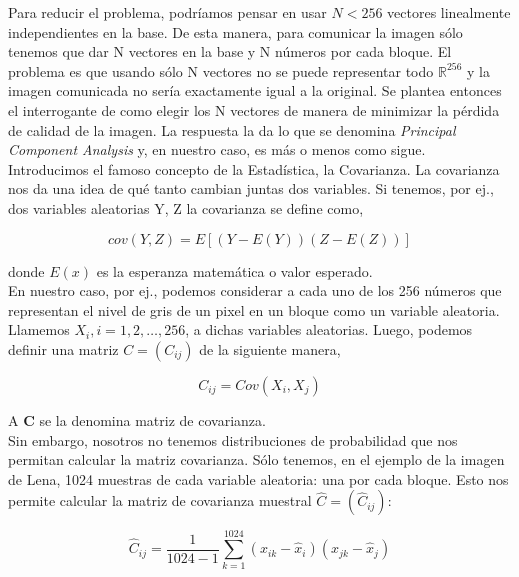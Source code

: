 \documentclass[twocolumn,a4paper,10pt]{article}
\begin{document}
Para reducir el problema, podríamos pensar en usar $N < 256$ vectores linealmente independientes en la base. De esta manera, para comunicar la imagen s\'olo
tenemos que dar N vectores en la base y N n\'umeros por cada bloque. El problema es que usando s\'olo N vectores no se puede representar todo $\mathbb{R}^{256}$ y la 
imagen comunicada no ser\'ia exactamente igual a la original. Se plantea entonces el interrogante de como elegir los N vectores de manera de minimizar la p\'erdida 
de calidad de la imagen. La respuesta la da lo que se denomina \textit{Principal Component Analysis} y, en nuestro caso, es m\'as o menos como sigue.\\

Introducimos el famoso concepto de la Estadística, la Covarianza. La covarianza nos da una idea de qu\'e tanto cambian juntas dos variables. Si tenemos, por ej., 
dos variables aleatorias Y, Z la covarianza se define como,

\begin{equation}
    cov(Y, Z) = E [(Y - E(Y )) (Z - E(Z))]
\end{equation}

donde $E(x)$ es la esperanza matem\'atica o valor esperado. \\

En nuestro caso, por ej., podemos considerar a cada uno de los 256 n\'umeros que representan el nivel de gris de un pixel en un bloque como un variable aleatoria.
Llamemos $X_{i}, i = 1, 2, \dotsc, 256$, a dichas variables aleatorias. Luego, podemos definir una matriz $C = (C_{ij} )$ de la siguiente manera,

\begin{equation}
    C_{ij} = Cov(X_{i}, X_{j})
\end{equation}

A $\textbf{C}$ se la denomina matriz de covarianza.\\

Sin embargo, nosotros no tenemos distribuciones de probabilidad que nos permitan calcular la matriz covarianza. S\'olo tenemos, en el ejemplo de la imagen
de Lena, 1024 muestras de cada variable aleatoria: una por cada bloque. Esto nos permite calcular la matriz de covarianza muestral $\widehat{C} = (\widehat{C}_{ij})$:

\begin{equation}
    \widehat{C}_{ij} =  \frac{1}{1024 - 1}\sum_{k=1}^{1024} (x_{ik} - \widehat{x}_{i}) (x_{jk} - \widehat{x}_{j})
\end{equation}
\end{document}
